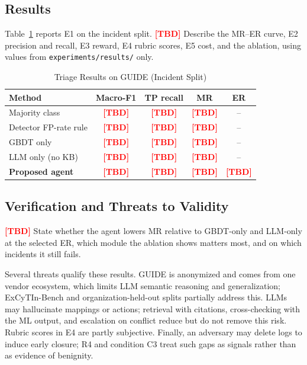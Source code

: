 \documentclass[conference]{IEEEtran}
\newcommand{\TBD}{\textcolor{red}{\textbf{[TBD]}}}
\begin{document}
\subsection{Results}
Table~\ref{tab:e1} reports E1 on the incident split.
\TBD{} Describe the MR--ER curve, E2 precision and recall, E3 reward,
E4 rubric scores, E5 cost, and the ablation, using values from
\texttt{experiments/results/} only.

\begin{table}[t]
\caption{Triage Results on GUIDE (Incident Split)}
\label{tab:e1}
\centering
\footnotesize
\setlength{\tabcolsep}{3pt}
\begin{tabular}{@{}lcccc@{}}
\toprule
\textbf{Method} & \textbf{Macro-F1} & \textbf{TP recall}
& \textbf{MR} & \textbf{ER} \\
\midrule
Majority class        & \TBD & \TBD & \TBD & -- \\
Detector FP-rate rule & \TBD & \TBD & \TBD & -- \\
GBDT only             & \TBD & \TBD & \TBD & -- \\
LLM only (no KB)      & \TBD & \TBD & \TBD & -- \\
\textbf{Proposed agent} & \TBD & \TBD & \TBD & \TBD \\
\bottomrule
\end{tabular}
\end{table}

\subsection{Verification and Threats to Validity}
\TBD{} State whether the agent lowers MR relative to GBDT-only and
LLM-only at the selected ER, which module the ablation shows matters
most, and on which incidents it still fails.

Several threats qualify these results. GUIDE is anonymized and comes
from one vendor ecosystem, which limits LLM semantic reasoning and
generalization; ExCyTIn-Bench and organization-held-out splits
partially address this. LLMs may hallucinate mappings or actions;
retrieval with citations, cross-checking with the ML output, and
escalation on conflict reduce but do not remove this risk. Rubric
scores in E4 are partly subjective. Finally, an adversary may delete
logs to induce early closure; R4 and condition C3 treat such gaps as
signals rather than as evidence of benignity.

\end{document}
